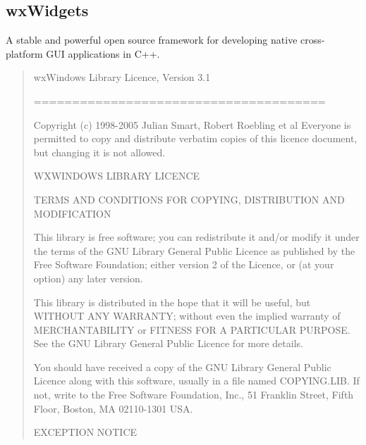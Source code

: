 \documentclass[
]{book}
\theoremstyle{definition}
\theoremstyle{definition}
\theoremstyle{definition}
\theoremstyle{definition}
\theoremstyle{remark}
\begin{document}
\hypertarget{wxwidgets}{%
\subsection*{wxWidgets}\label{wxwidgets}}

A stable and powerful open source framework for developing native cross-platform GUI applications in C++.

\begin{quote}
wxWindows Library Licence, Version 3.1

======================================

Copyright (c) 1998-2005 Julian Smart, Robert Roebling et al
Everyone is permitted to copy and distribute verbatim copies
of this licence document, but changing it is not allowed.

WXWINDOWS LIBRARY LICENCE

TERMS AND CONDITIONS FOR COPYING, DISTRIBUTION AND MODIFICATION

This library is free software; you can redistribute it and/or modify it
under the terms of the GNU Library General Public Licence as published by
the Free Software Foundation; either version 2 of the Licence, or (at
your option) any later version.

This library is distributed in the hope that it will be useful, but
WITHOUT ANY WARRANTY; without even the implied warranty of
MERCHANTABILITY or FITNESS FOR A PARTICULAR PURPOSE. See the GNU Library
General Public Licence for more details.

You should have received a copy of the GNU Library General Public Licence
along with this software, usually in a file named COPYING.LIB. If not,
write to the Free Software Foundation, Inc., 51 Franklin Street, Fifth Floor,
Boston, MA 02110-1301 USA.

EXCEPTION NOTICE


\end{quote}
\end{document}
